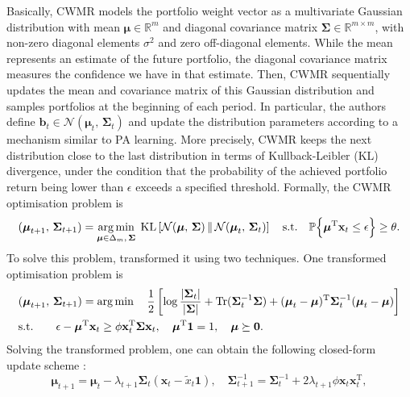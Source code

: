 Basically, CWMR models the portfolio weight vector as a multivariate Gaussian distribution with mean $\boldsymbol{\mu} \in \mathbb{R}^m$ and diagonal covariance matrix $\boldsymbol{\Sigma} \in \mathbb{R}^{m\times m}$, with non-zero diagonal elements $\sigma^2$ and zero off-diagonal elements. While the mean represents an estimate of the future portfolio, the diagonal covariance matrix measures the confidence we have in that estimate. Then, CWMR sequentially updates the mean and covariance matrix of this Gaussian distribution and samples portfolios at the beginning of each period. In particular, the authors define $\mathbf{b}_t \in \mathcal{N}(\boldsymbol{\mu}_t, \, \boldsymbol{\Sigma}_t)$ and update the distribution parameters according to a mechanism similar to PA learning. More precisely, CWMR keeps the next distribution close to the last distribution in terms of Kullback-Leibler (KL) divergence, under the condition that the probability of the achieved portfolio return being lower than $\epsilon$ exceeds a specified threshold. Formally, the CWMR optimisation problem is
\begin{equation}
	(\boldsymbol{\mu}_{t+1}, \, \boldsymbol{\Sigma}_{t+1})
	= \operatorname*{arg\,min}_{\boldsymbol{\mu} \in \Delta_m, \, \boldsymbol{\Sigma}} \; \mathrm{KL}\left[\mathcal{N}(\boldsymbol{\mu}, \, \boldsymbol{\Sigma}) \, \Vert \, \mathcal{N}(\boldsymbol{\mu}_t, \, \boldsymbol{\Sigma}_t)\right]
	\quad \text{s.t.} \quad \mathbb{P}\Big\{\boldsymbol{\mu}^\text{T} \mathbf{x}_t \leq \epsilon\Big\} \geq \theta.
\end{equation}
To solve this problem, \citet{li13} transformed it using two techniques. One transformed optimisation problem \citep[Eq.~(3)]{li13} is
\begin{align}
	& (\boldsymbol{\mu}_{t+1}, \, \boldsymbol{\Sigma}_{t+1})
	= \operatorname*{arg\,min} \quad \frac{1}{2}\left[\log\frac{|\boldsymbol{\Sigma}_t|}{|\boldsymbol{\Sigma}|} + \mathrm{Tr}(\boldsymbol{\Sigma}_{t}^{-1}\boldsymbol{\Sigma}) + (\boldsymbol{\mu}_t - \boldsymbol{\mu})^\text{T}\boldsymbol{\Sigma}_{t}^{-1}(\boldsymbol{\mu}_t - \boldsymbol{\mu})\right]
	\nonumber \\
	& \text{s.t.} \qquad \epsilon - \boldsymbol{\mu}^\text{T}\mathbf{x}_t \geq \phi\mathbf{x}_t^\text{T}\boldsymbol{\Sigma}\mathbf{x}_t, \quad \boldsymbol{\mu}^\text{T}\mathbf{1} = 1, \quad \boldsymbol{\mu} \succeq \mathbf{0}.
\end{align}
Solving the transformed problem, one can obtain the following closed-form update scheme \citep[Proposition~4.1]{li13}:
\begin{equation}
	\boldsymbol{\mu}_{t+1} = \boldsymbol{\mu}_t - \lambda_{t+1}\boldsymbol{\Sigma}_t(\mathbf{x}_t - \widetilde{x}_t\mathbf{1}),
	\quad \boldsymbol{\Sigma}_{t+1}^{-1} = \boldsymbol{\Sigma}_t^{-1} + 2\lambda_{t+1}\phi\mathbf{x}_t\mathbf{x}_t^\text{T},
\end{equation}
